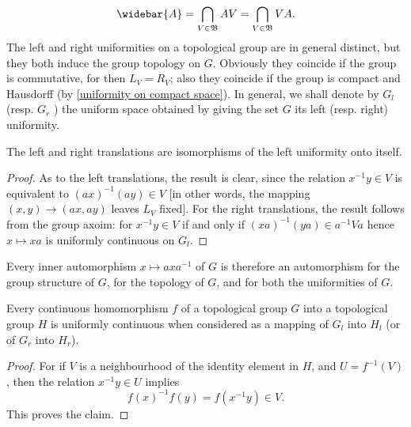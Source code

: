 \[\widebar{A}=\bigcap_{V\in\mathfrak{B}}AV=\bigcap_{V\in\mathfrak{B}}VA.\]
The left and right uniformities on a topological group are in general distinct, but they both induce the group topology on $G$. Obviously they coincide if the group is commutative, for then $L_V=R_V$; also they coincide if the group is compact and Hausdorff (by \cref{uniformity on compact space}). In general, we shall denote by $G_l$ (resp. $G_r$ ) the uniform space obtained by giving the set $G$ its left (resp. right) uniformity.
\begin{proposition}
The left and right translations are isomorphisms of the left uniformity onto itself.
\end{proposition}
\begin{proof}
As to the left translations, the result is clear, since the relation $x^{-1}y\in V$ is equivalent to $(ax)^{-1}(ay)\in V$ [in other words, the mapping $(x,y)\to(ax,ay)$ leaves $L_V$ fixed]. For the right translations, the result follows from the group axoim: for $x^{-1}y\in V$ if and only if $(xa)^{-1}(ya)\in a^{-1}Va$ hence $x\mapsto xa$ is uniformly continuous on $G_l$.
\end{proof}
Every inner automorphism $x\mapsto axa^{-1}$ of $G$ is therefore an automorphism for the group structure of $G$, for the topology of $G$, and for both the uniformities of $G$.
\begin{proposition}\label{topological group homomorphism is uniformly continuous}
Every continuous homomorphism $f$ of a topological group $G$ into a topological group $H$ is uniformly continuous when considered as a mapping of $G_l$ into $H_l$ (or of $G_r$ into $H_r$).
\end{proposition}
\begin{proof}
For if $V$ is a neighbourhood of the identity element in $H$, and $U=f^{-1}(V)$, then the relation $x^{-1}y\in U$ implies
\[f(x)^{-1}f(y)=f(x^{-1}y)\in V.\]
This proves the claim.
\end{proof}
